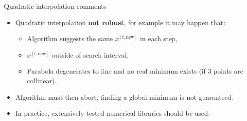 %


\begin{vbframe}{Quadratic interpolation comments}
\begin{itemize}
\item Quadratic interpolation \textbf{not robust}, for example it may happen that:
\begin{itemize}
\item Algorithm suggests the same $x^{[t, \text{new}]}$ in each step,
\item $x^{[t, \text{new}]}$ outside of search interval,
\item Parabola degenerates to line and no real minimum exists (if 3 points are collinear).
\end{itemize}
\item Algorithm must then abort, finding a global minimum is not guaranteed.
\item In practice, extensively tested numerical libraries should be used.
\end{itemize}
\end{vbframe}

